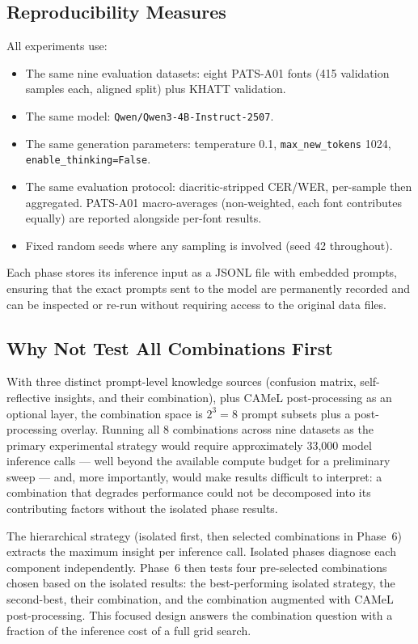 \subsection{Reproducibility Measures}
\label{subsec:reproducibility}

All experiments use:
\begin{itemize}
  \item The same nine evaluation datasets: eight PATS-A01 fonts (415 validation
        samples each, aligned split) plus KHATT validation.
  \item The same model: \texttt{Qwen/Qwen3-4B-Instruct-2507}.
  \item The same generation parameters: temperature 0.1,
        \texttt{max\_new\_tokens} 1024, \texttt{enable\_thinking=False}.
  \item The same evaluation protocol: diacritic-stripped CER/WER, per-sample
        then aggregated. PATS-A01 macro-averages (non-weighted, each font
        contributes equally) are reported alongside per-font results.
  \item Fixed random seeds where any sampling is involved (seed 42 throughout).
\end{itemize}
Each phase stores its inference input as a JSONL file with embedded prompts,
ensuring that the exact prompts sent to the model are permanently recorded
and can be inspected or re-run without requiring access to the original data
files.

\subsection{Why Not Test All Combinations First}
\label{subsec:why_not_all}

With three distinct prompt-level knowledge sources (confusion matrix,
self-reflective insights, and their combination), plus CAMeL post-processing
as an optional layer, the combination space is $2^3 = 8$ prompt subsets plus
a post-processing overlay. Running all 8 combinations across nine datasets
as the primary experimental strategy would require approximately 33,000 model
inference calls --- well beyond the available compute budget for a
preliminary sweep --- and, more importantly, would make results difficult to
interpret: a combination that degrades performance could not be decomposed
into its contributing factors without the isolated phase results.

The hierarchical strategy (isolated first, then selected combinations in
Phase~6) extracts the maximum insight per inference call. Isolated phases
diagnose each component independently. Phase~6 then tests four pre-selected
combinations chosen based on the isolated results: the best-performing
isolated strategy, the second-best, their combination, and the combination
augmented with CAMeL post-processing. This focused design answers the
combination question with a fraction of the inference cost of a full grid
search.

